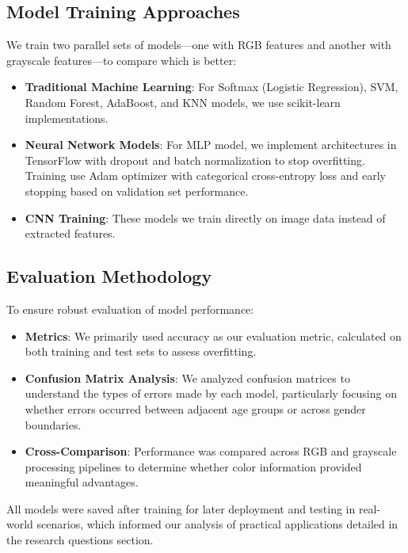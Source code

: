 \documentclass{article}
\begin{document}
\subsection{Model Training Approaches}

We train two parallel sets of models—one with RGB features and another with grayscale features—to compare which is better:

\begin{itemize}
    \item \textbf{Traditional Machine Learning}: For Softmax (Logistic Regression), SVM, Random Forest, AdaBoost, and KNN models, we use scikit-learn implementations.
    
    \item \textbf{Neural Network Models}: For MLP model, we implement architectures in TensorFlow with dropout and batch normalization to stop overfitting. Training use Adam optimizer with categorical cross-entropy loss and early stopping based on validation set performance.
    
    \item \textbf{CNN Training}: These models we train directly on image data instead of extracted features.
\end{itemize}


\subsection{Evaluation Methodology}
To ensure robust evaluation of model performance:

\begin{itemize}
    \item \textbf{Metrics}: We primarily used accuracy as our evaluation metric, calculated on both training and test sets to assess overfitting.
    
    \item \textbf{Confusion Matrix Analysis}: We analyzed confusion matrices to understand the types of errors made by each model, particularly focusing on whether errors occurred between adjacent age groups or across gender boundaries.
    
    \item \textbf{Cross-Comparison}: Performance was compared across RGB and grayscale processing pipelines to determine whether color information provided meaningful advantages.
\end{itemize}

All models were saved after training for later deployment and testing in real-world scenarios, which informed our analysis of practical applications detailed in the research questions section.
\end{document}
